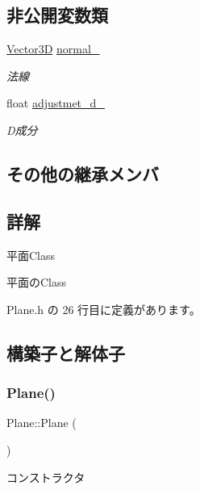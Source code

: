 \subsection*{非公開変数類}
\begin{DoxyCompactItemize}
\item 
\mbox{\hyperlink{class_vector3_d}{Vector3D}} \mbox{\hyperlink{class_plane_a7ae74465500dfdd7a68fa2eb28486ae0}{normal\+\_\+}}
\begin{DoxyCompactList}\small\item\em 法線 \end{DoxyCompactList}\item 
float \mbox{\hyperlink{class_plane_ab43e3263bd879ea710936d85cacb6006}{adjustmet\+\_\+d\+\_\+}}
\begin{DoxyCompactList}\small\item\em D成分 \end{DoxyCompactList}\end{DoxyCompactItemize}
\subsection*{その他の継承メンバ}


\subsection{詳解}
平面\+Class 

平面の\+Class 

 Plane.\+h の 26 行目に定義があります。



\subsection{構築子と解体子}
\mbox{\label{class_plane_acac0d9c003e0ab10d07b146c3566a0c7}} 
\subsubsection{\texorpdfstring{Plane()}{Plane()}}
{\footnotesize\ttfamily Plane\+::\+Plane (\begin{DoxyParamCaption}{ }\end{DoxyParamCaption})\hspace{0.3cm}{\ttfamily [inline]}}



コンストラクタ 


